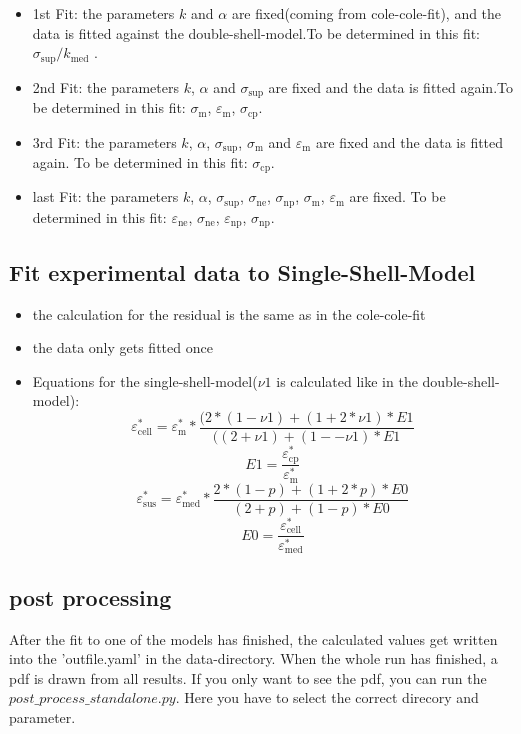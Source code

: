 \documentclass[10pt,a4paper]{article}
\renewcommand{\*}{\cdot}
\begin{document}
\begin{itemize}
\item 1st Fit: the parameters $k$ and $\alpha$ are fixed(coming from cole-cole-fit), and the data is fitted against the double-shell-model.To be determined in this fit: $\sigma_\mathrm{sup} / k_\mathrm{med}$ . 
\item 2nd Fit: the parameters $k$, $\alpha$ and $\sigma_\mathrm{sup}$ are fixed and the data is fitted again.To be determined in this fit: $\sigma_\mathrm{m}$, $\varepsilon_\mathrm{m}$, $\sigma_\mathrm{cp}$. 
\item 3rd Fit: the parameters $k$, $\alpha$, $\sigma_\mathrm{sup}$, $\sigma_\mathrm{m}$ and $\varepsilon_\mathrm{m}$ are fixed and the data is fitted again. To be determined in this fit: $\sigma_\mathrm{cp}$.

\item last Fit: the parameters $k$, $\alpha$, $\sigma_\mathrm{sup}$, $\sigma_\mathrm{ne}$, $\sigma_\mathrm{np}$, $\sigma_\mathrm{m}$, $\varepsilon_\mathrm{m}$ are fixed. To be determined in this fit: $\varepsilon_\mathrm{ne}$, $\sigma_\mathrm{ne}$, $\varepsilon_\mathrm{np}$, $\sigma_\mathrm{np}$.
\end{itemize}
\subsection{Fit experimental data to Single-Shell-Model}
\begin{itemize}
\item the calculation for the residual is the same as in the cole-cole-fit
\item the data only gets fitted once
\item Equations for the single-shell-model($\nu1$ is calculated like in the double-shell-model): 
\begin{equation}
\varepsilon_\mathrm{cell}^* = \varepsilon_\mathrm{m}^* * \frac{(2 * (1 - \nu1) + (1 + 2 * \nu1) * E1}{((2 + \nu1) + (1 - -\nu1) * E1}
\end{equation}
\begin{equation}
E1 = \frac{\varepsilon_\mathrm{cp}^*}{\varepsilon_\mathrm{m}^*}
\end{equation}
\begin{equation}
\varepsilon_\mathrm{sus}^* = \varepsilon_\mathrm{med}^* * \frac{2 * (1- p) + (1 + 2 * p) * E0}{(2 + p) + (1- p) * E0}
\end{equation}
\begin{equation}
E0  = \frac{\varepsilon_\mathrm{cell}^*}{\varepsilon_\mathrm{med}^*}
\end{equation}
\end{itemize}
\subsection{post processing}
After the fit to one of the models has finished, the calculated values get written into the 'outfile.yaml' in the data-directory. When the whole run has finished, a pdf is drawn from all results. If you only want to see the pdf, you can run the $post\_process\_standalone.py$. Here you have to select the correct direcory and parameter. 
\end{document}

